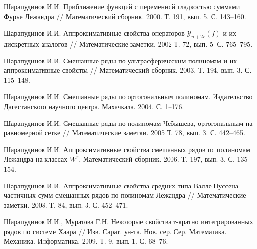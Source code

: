 \begin{thebibliography}{999}


Шарапудинов И.И. Приближение функций с переменной гладкостью суммами Фурье Лежандра //
Математический сборник. 2000. Т. 191, вып. 5. С. 143--160.






Шарапудинов И.И.
Аппроксимативные свойства операторов $\mathcal{Y}_{n+2r}(f)$ и их дискретных аналогов //
Математические заметки. 2002 Т. 72, вып. 5. С. 765--795.





Шарапудинов И.И. Смешанные ряды по ультрасферическим полиномам и их аппроксимативные свойства //
Математический сборник. 2003. Т. 194, вып. 3. С. 115--148.





Шарапудинов И.И.
Смешанные ряды по ортогональным полиномам. Издательство Дагестанского научного центра. Махачкала. 2004. С. 1--176.






Шарапудинов И.И. Смешанные ряды по полиномам Чебышева, ортогональным на равномерной сетке // Математические заметки. 2005 Т. 78, вып. 3. С. 442--465.






Шарапудинов И.И.
Аппроксимативные свойства смешанных рядов по полиномам Лежандра на классах $W^r$,
Математический сборник. 2006. Т. 197, вып. 3. С. 135--154.





Шарапудинов И.И.
Аппроксимативные свойства средних типа Валле-Пуссена частичных сумм смешанных рядов по полиномам Лежандра //
Математические заметки. 2008. Т. 84, вып. 3. С. 452--471.





 Шарапудинов И.И.,  Муратова Г.Н. Некоторые свойства r-кратно интегрированных рядов по системе Хаара // Изв. Сарат. ун-та. Нов. сер. Сер. Математика. Механика. Информатика. 2009. Т. 9, вып. 1. С. 68--76.






\end{thebibliography}
